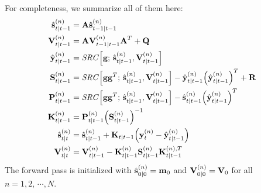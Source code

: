 		For completeness, we summarize all of them here:
		\begin{align*}
			\hat{\boldsymbol{\mathrm{s}}}_{t \vert t - 1}^{(n)} &= \boldsymbol{\mathrm{A}} \hat{\boldsymbol{\mathrm{s}}}_{t - 1 \vert t - 1}^{(n)} \\
			\boldsymbol{\mathrm{V}}_{t \vert t - 1}^{(n)} &= \boldsymbol{\mathrm{A}} \boldsymbol{\mathrm{V}}_{t - 1 \vert t - 1}^{(n)} \boldsymbol{\mathrm{A}}^T + \boldsymbol{\mathrm{Q}} \\
			\hat{\boldsymbol{\mathrm{y}}}_{t \vert t - 1}^{(n)} &= \mathit{SRC}\Big[ \boldsymbol{\mathrm{g}};\, \hat{\boldsymbol{\mathrm{s}}}_{t \vert t - 1}^{(n)}, \boldsymbol{\mathrm{V}}_{t \vert t - 1}^{(n)} \Big] \\
			\boldsymbol{\mathrm{S}}_{t \vert t - 1}^{(n)} &= \mathit{SRC}\Big[ \boldsymbol{\mathrm{g}} \boldsymbol{\mathrm{g}}^T;\, \hat{\boldsymbol{\mathrm{s}}}_{t \vert t - 1}^{(n)}, \boldsymbol{\mathrm{V}}_{t \vert t - 1}^{(n)} \Big] - \hat{\boldsymbol{\mathrm{y}}}_{t \vert t - 1}^{(n)} \Big( \hat{\boldsymbol{\mathrm{y}}}_{t \vert t - 1}^{(n)} \Big)^T + \boldsymbol{\mathrm{R}} \\
			\boldsymbol{\mathrm{P}}_{t \vert t - 1}^{(n)} &= \mathit{SRC}\Big[ \boldsymbol{\mathrm{g}} \boldsymbol{\mathrm{g}}^T;\, \hat{\boldsymbol{\mathrm{s}}}_{t \vert t - 1}^{(n)}, \boldsymbol{\mathrm{V}}_{t \vert t - 1}^{(n)} \Big] - \hat{\boldsymbol{\mathrm{s}}}_{t \vert t - 1}^{(n)} \Big(\hat{\boldsymbol{\mathrm{y}}}_{t \vert t - 1}^{(n)}\Big)^T \\
			\boldsymbol{\mathrm{K}}_{t \vert t - 1}^{(n)} &= \boldsymbol{\mathrm{P}}_{t \vert t - 1}^{(n)} \Big(\boldsymbol{\mathrm{S}}_{t \vert t - 1}^{(n)}\Big)^{-1} \\
			\hat{\boldsymbol{\mathrm{s}}}_{t \vert t}^{(n)} &= \hat{\boldsymbol{\mathrm{s}}}_{t \vert t - 1}^{(n)} + \boldsymbol{\mathrm{K}}_{t \vert t - 1} \Big(\boldsymbol{\mathrm{y}}_t^{(n)} - \hat{\boldsymbol{\mathrm{y}}}_{t \vert t - 1}^{(n)}\Big) \\
			\boldsymbol{\mathrm{V}}_{t \vert t}^{(n)} &= \boldsymbol{\mathrm{V}}_{t \vert t - 1}^{(n)} - \boldsymbol{\mathrm{K}}_{t \vert t - 1}^{(n)} \boldsymbol{\mathrm{S}}_{t \vert t - 1}^{(n)} \boldsymbol{\mathrm{K}}_{t \vert t - 1}^{(n), T}
		\end{align*}
		The forward pass is initialized with \( \hat{\boldsymbol{\mathrm{s}}}_{0 \vert 0}^{(n)} = \boldsymbol{\mathrm{m}}_0 \) and \( \boldsymbol{\mathrm{V}}_{0 \vert 0}^{(n)} = \boldsymbol{\mathrm{V}}_0 \) for all \( n = 1, 2, \,\cdots\!, N \).

